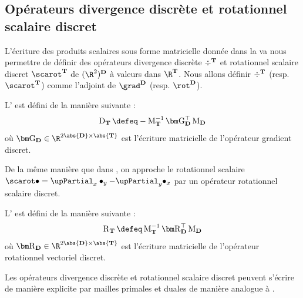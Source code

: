 \subsection{Opérateurs divergence discrète et rotationnel scalaire discret} \label{sec:discrete_divergence_and_scalar_curl_operators}

L'écriture des produits scalaires sous forme matricielle donnée dans la  va nous permettre de définir des opérateurs divergence discrète $\div^{\mathbf{T}}$ et rotationnel scalaire discret $\scarot^\ensddfvplat$ de $(\R^2)^\ensdiamantplat$ à valeurs dans $\R^\ensddfvplat$. Nous allons définir $\div^{\mathbf{T}}$ (resp. $\scarot^\ensddfvplat$) comme l'adjoint de $\grad^\ensdiamantplat$ (resp. $\rot^\ensdiamantplat$).

\begin{defi} \label{defi:discrete_divergence}
L' est défini de la manière suivante :
\[
\divmat_\ensddfvplat \defeq - \masse^{-1}_\ensddfvplat \gradmat^\top_\ensdiamantplat \masse_\ensdiamantplat
\]
où $\gradmat_\ensdiamantplat \in \R^{2 \abs{\ensdiamantplat} \times \abs{\ensddfvplat}}$ est l'écriture matricielle de l'opérateur gradient discret.
\end{defi}

De la même manière que dans \cite[Definition 3.5]{delcourte_discrete_2007}, on approche le rotationnel scalaire $\scarot \bullet = \upPartial_x \bullet_y - \upPartial_y \bullet_x$ par un opérateur rotationnel scalaire discret.

\begin{defi} \label{defi:discrete_scalar_curl}
L' est défini de la manière suivante :
\[
\scarotmat_\ensddfvplat \defeq \masse^{-1}_\ensddfvplat \rotmat^\top_\ensdiamantplat \masse_\ensdiamantplat
\]
où $\rotmat_\ensdiamantplat \in \R^{2 \abs{\ensdiamantplat} \times \abs{\ensddfvplat}}$ est l'écriture matricielle de l'opérateur rotationnel vectoriel discret.
\end{defi}

\begin{remarque}
Les opérateurs divergence discrète et rotationnel scalaire discret peuvent s'écrire de manière explicite par mailles primales et duales de manière analogue à \cite[Definitions 3.4 \& 3.5]{delcourte_discrete_2007}.
\end{remarque}